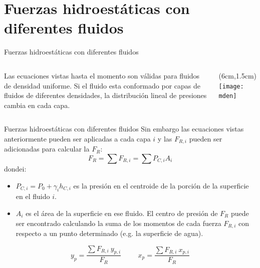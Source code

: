 \documentclass [xcolor=svgnames, t] {beamer}
\begin{document}
\section{Fuerzas hidroest\'aticas con diferentes fluidos}
\begin{frame}{Fuerzas hidroest\'aticas con diferentes fluidos}
\begin{columns}
Las ecuaciones  vistas hasta el momento son v\'alidas para fluidos de densidad uniforme. Si el fluido esta conformado por capas de fluidos de diferentes densidades, la distribuci\'on lineal de presiones cambia en cada capa. 
\begin{textblock*}{6cm}(6cm,1.5cm) %
\texttt{[image: mden]}
\end{textblock*}
\end{columns}
\end{frame}

\begin{frame}{Fuerzas hidroest\'aticas con diferentes fluidos}
Sin embargo las ecuaciones vistas anteriormente pueden ser aplicadas a cada capa $i$ y las $F_{R,i}$ pueden ser adicionadas para calcular la $F_R$:
$$
F_R = \sum F_{R,i} = \sum P_{C,i}A_i
$$
dondei: 
\begin{itemize}
\item $P_{C,i} =  P_0 + \gamma_i h_{C,i}$ es la presi\'on en el centroide de la porci\'on de la superficie en el fluido $i$.
\item $A_i$ es el \'area de la superficie en ese fluido. El centro de presi\'on de $F_R$ puede ser encontrado calculando la suma de los momentos de cada fuerza $F_{R,i}$ con respecto a un punto determinado (e.g. la superficie de agua).
\end{itemize}
$$
y_p = \frac{\sum F_{R,i}\ y_{p,i}}{F_R} \hspace{1cm} x_p = \frac{\sum F_{R,i}\ x_{p,i}}{F_R}
$$
\end{frame}
\end{document}
